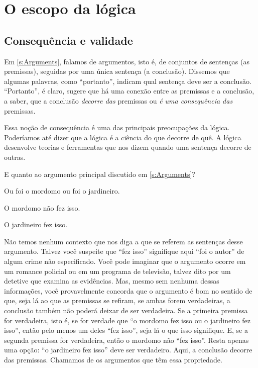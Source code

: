 \chapter{O escopo da lógica}
\label{s:Valid}

\section{Consequência e validade}

Em \cref{s:Arguments}, falamos de argumentos, isto é, de conjuntos de sentenças (as premissas), seguidas por uma única sentença (a conclusão). Dissemos que algumas palavras, como \textquotedblleft portanto\textquotedblright{}, indicam qual sentença deve ser a conclusão. \textquotedblleft Portanto\textquotedblright{}, é claro, sugere que há uma conexão entre as premissas e a conclusão, a saber, que a conclusão \emph{decorre das} premissas ou \emph{é uma consequência das} premissas.

Essa noção de consequência é uma das principais preocupações da lógica. Poderíamos até dizer que a lógica é a ciência do que decorre de quê. A lógica desenvolve teorias e ferramentas que nos dizem quando uma sentença decorre de outras.

E quanto ao argumento principal discutido em \cref{s:Arguments}? 
\begin{earg}
	\item[] Ou foi o mordomo ou foi o jardineiro.
	\item[] O mordomo não fez isso.
	\item[\texttherefore] O jardineiro fez isso.
\end{earg}
Não temos nenhum contexto que nos diga a que se referem as sentenças desse argumento. Talvez você suspeite que \textquotedblleft fez isso\textquotedblright{} signifique aqui \textquotedblleft foi o autor\textquotedblright{} de algum crime não especificado. Você pode imaginar que o argumento ocorre em um romance policial ou em um programa de televisão, talvez dito por um detetive que examina as evidências. Mas, mesmo sem nenhuma dessas informações, você provavelmente concorda que o argumento é bom no sentido de que, seja lá ao que as premissas se refiram, se ambas forem verdadeiras, a conclusão também não poderá deixar de ser verdadeira. Se a primeira premissa for verdadeira, isto é, se for verdade que \textquotedblleft o mordomo fez isso ou o jardineiro fez isso\textquotedblright{}, então pelo menos um deles \textquotedblleft fez isso\textquotedblright{}, seja lá o que isso signifique. E, se a segunda premissa for verdadeira, então o mordomo não \textquotedblleft fez isso\textquotedblright{}. Resta apenas uma opção: \textquotedblleft o jardineiro fez isso\textquotedblright{} deve ser verdadeiro. Aqui, a conclusão decorre das premissas. Chamamos de  os argumentos que têm essa propriedade.

